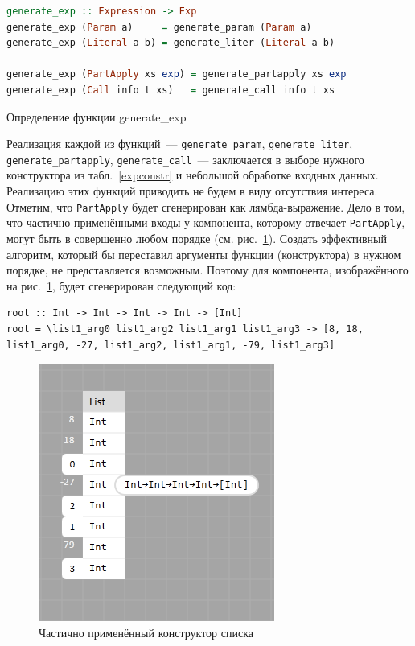 \begin{ListingEnv}[h]
\begin{lstlisting}[language=Haskell]
generate_exp :: Expression -> Exp
generate_exp (Param a)     = generate_param (Param a)
generate_exp (Literal a b) = generate_liter (Literal a b)

generate_exp (PartApply xs exp) = generate_partapply xs exp
generate_exp (Call info t xs)   = generate_call info t xs
\end{lstlisting}
	\caption{Определение функции generate\_exp}\label{genexp}
\end{ListingEnv}

		Реализация каждой из функций~--- \lstinline!generate_param!, \lstinline!generate_liter!, \lstinline!generate_partapply!, \lstinline!generate_call!~--- заключается в выборе нужного конструктора из табл.~\ref{expconstr} и небольшой обработке входных данных. Реализацию этих функций приводить не будем в виду отсутствия интереса. Отметим, что \lstinline!PartApply! будет сгенерирован как лямбда-выражение. Дело в том, что частично применёнными входы у компонента, которому отвечает \lstinline!PartApply!, могут быть в совершенно любом порядке (см. рис.~\ref{part_list}). Создать эффективный алгоритм, который бы переставил аргументы функции (конструктора) в нужном порядке, не представляется возможным. Поэтому для компонента, изображённого на рис.~\ref{part_list}, будет сгенерирован следующий код:
		
\begin{ListingEnv}[H]
	\begin{lstlisting}
root :: Int -> Int -> Int -> Int -> [Int]
root = \list1_arg0 list1_arg2 list1_arg1 list1_arg3 -> [8, 18, list1_arg0, -27, list1_arg2, list1_arg1, -79, list1_arg3]
	\end{lstlisting}
\end{ListingEnv}		

\begin{figure}[h]
	\centering
	\includegraphics{img/partapply.PNG}
	\caption{Частично применённый конструктор списка}\label{part_list}
\end{figure}
	
